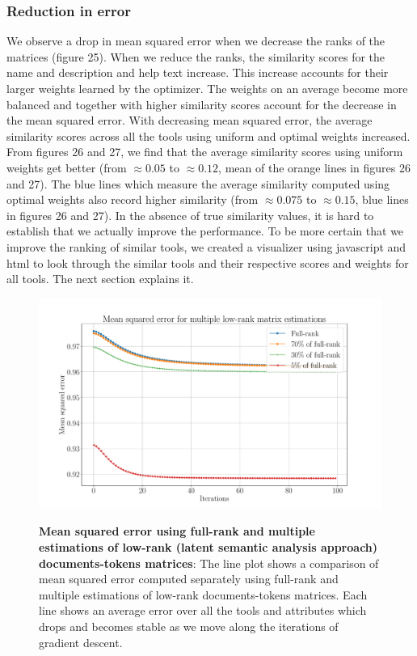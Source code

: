 \subsubsection{Reduction in error}
We observe a drop in mean squared error when we decrease the ranks of the matrices (figure 25). When we reduce the ranks, the similarity scores for the name and description and help text increase. This increase accounts for their larger weights learned by the optimizer. The weights on an average become more balanced and together with higher similarity scores account for the decrease in the mean squared error. With decreasing mean squared error, the average similarity scores across all the tools using uniform and optimal weights increased. From figures 26 and 27, we find that the average similarity scores using uniform weights get better (from $\approx0.05$ to $\approx0.12$, mean of the orange lines in figures 26 and 27). The blue lines which measure the average similarity computed using optimal weights also record higher similarity (from $\approx0.075$ to $\approx0.15$, blue lines in figures 26 and 27). In the absence of true similarity values, it is hard to establish that we actually improve the performance. To be more certain that we improve the ranking of similar tools, we created a visualizer using javascript and html to look through the similar tools and their respective scores and weights for all tools. The next section explains it.

\begin{figure}[h]
\begin{centering}
    {\includegraphics[scale=0.37]{figures/MSE_iterations_low_rank.pdf}}
    \caption[Mean squared error using full-rank and multiple estimations of low-rank (latent semantic analysis approach]{\textbf{Mean squared error using full-rank and multiple estimations of low-rank (latent semantic analysis approach) documents-tokens matrices}: The line plot shows a comparison of mean squared error computed separately using full-rank and multiple estimations of low-rank documents-tokens matrices. Each line shows an average error over all the tools and attributes which drops and becomes stable as we move along the iterations of gradient descent.}
\end{centering}
\end{figure}

